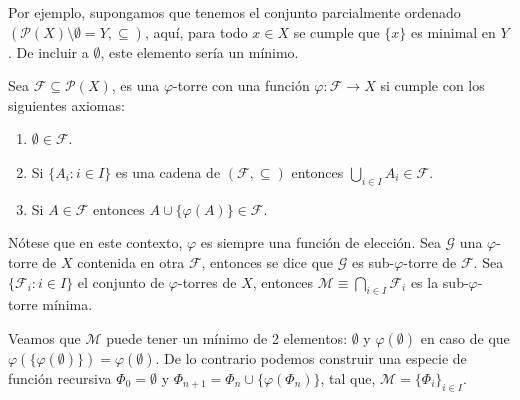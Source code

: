 \documentclass[11pt,oneside,a4paper]{book}
\renewcommand{\P}{\mathcal{P}}
\begin{document}
Por ejemplo, supongamos que tenemos el conjunto parcialmente ordenado $(\P(X)\setminus\emptyset=Y,\subseteq)$, aquí, para todo $x\in X$ se cumple que $\{x\}$ es minimal en $Y$. De incluir a $\emptyset$, este elemento sería un mínimo.
\begin{mydef}
Sea $\mathcal{F}\subseteq\P(X)$, es una $\varphi$-torre con una función $\varphi:\mathcal{F}\rightarrow X$ si cumple con los siguientes axiomas:
\begin{enumerate}[(1)]
\item $\emptyset\in\mathcal{F}$.
\item Si $\{A_i:i\in I\}$ es una cadena de $(\mathcal{F},\subseteq)$ entonces $\bigcup_{i\in I}A_i\in\mathcal{F}$.
\item Si $A\in\mathcal{F}$ entonces $A\cup\{\varphi(A)\}\in\mathcal{F}$.
\end{enumerate}
\end{mydef}
Nótese que en este contexto, $\varphi$ es siempre una función de elección. Sea $\mathcal{G}$ una $\varphi$-torre de $X$ contenida en otra $\mathcal{F}$, entonces se dice que $\mathcal{G}$ es sub-$\varphi$-torre de $\mathcal{F}$. Sea $\{\mathcal{F}_i:i\in I\}$ el conjunto de $\varphi$-torres de $X$, entonces $\mathcal{M}\equiv\bigcap_{i\in I}\mathcal{F}_i$ es la sub-$\varphi$-torre mínima.

Veamos que $\mathcal{M}$ puede tener un mínimo de 2 elementos: $\emptyset$ y $\varphi(\emptyset)$ en caso de que $\varphi\left(\{\varphi(\emptyset)\}\right)=\varphi(\emptyset)$. De lo contrario podemos construir una especie de función recursiva $\Phi_0 = \emptyset$ y $\Phi_{n+1} = \Phi_n\cup\{\varphi(\Phi_n)\}$, tal que, $\mathcal{M}=\{\Phi_i\}_{i\in I}$.
\end{document}
